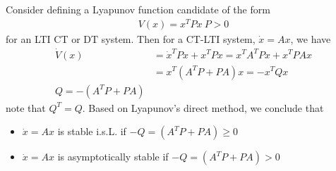 \documentclass[twoside]{article}
\begin{document}
Consider defining a Lyapunov function candidate of the form
%
\begin{align*}
V(x) = x^T P x  \ P > 0
\end{align*}
%
for an LTI CT or DT system. Then for a CT-LTI system, $\dot{x} = A x$, we have
%
\begin{align*}
\dot{V}(x) &= \dot{x}^T P x + x^T P x = x^T A^T P x + x^T P A x 
\\
&= x^T (A^T P + P A) x = - x^T Q x
\\
Q = - (A^T P + P A)
\end{align*}
%
note that $Q^T = Q$. Based on Lyapunov's direct method, we conclude that
\begin{itemize}
\item $\dot{x} = A x$ is stable i.s.L. if $-Q = (A^T P + P A) \geq 0$
%
\item $\dot{x} = A x$ is asymptotically stable if $-Q = (A^T P + P A) > 0$
\end{itemize}

\end{document}
